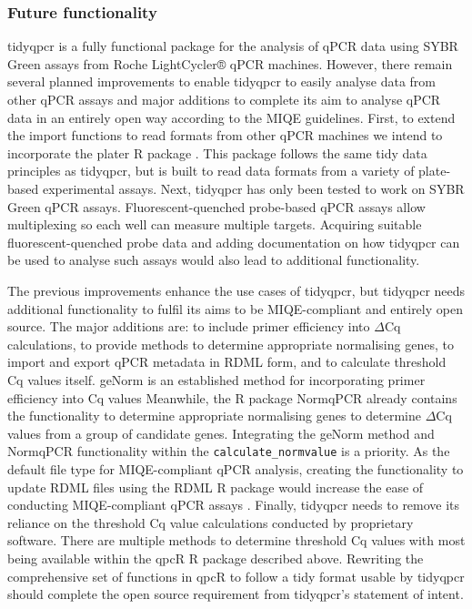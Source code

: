 \documentclass[../main.tex]{subfiles}
\begin{document}
\subsubsection{Future functionality}

tidyqpcr is a fully functional package for the analysis of qPCR data using SYBR Green assays from Roche LightCycler® qPCR machines. 
However, there remain several planned improvements to enable tidyqpcr to easily analyse data from other qPCR assays and major additions to complete its aim to analyse qPCR data in an entirely open way according to the MIQE guidelines.
First, to extend the import functions to read formats from other qPCR machines we intend to incorporate the plater R package \parencite{Hughes2016}.
This package follows the same tidy data principles as tidyqpcr, but is built to read data formats from a variety of plate-based experimental assays.
Next, tidyqpcr has only been tested to work on SYBR Green qPCR assays.
Fluorescent-quenched probe-based qPCR assays allow multiplexing so each well can measure multiple targets. 
Acquiring suitable fluorescent-quenched probe data and adding documentation on how tidyqpcr can be used to analyse such assays would also lead to additional functionality. 

The previous improvements enhance the use cases of tidyqpcr, but tidyqpcr needs additional functionality to fulfil its aims to be MIQE-compliant and entirely open source.
The major additions are: to include primer efficiency into $\Delta$Cq calculations, to provide methods to determine appropriate normalising genes, to import and export qPCR metadata in RDML form, and to calculate threshold Cq values itself. 
geNorm is an established method for incorporating primer efficiency into Cq values 
Meanwhile, the R package NormqPCR already contains the functionality to determine appropriate normalising genes to determine $\Delta$Cq values from a group of candidate genes. 
Integrating the geNorm method and NormqPCR functionality within the \lstinline{calculate_normvalue} is a priority.
As the default file type for MIQE-compliant qPCR analysis, creating the functionality to update RDML files using the RDML R package would increase the ease of conducting MIQE-compliant qPCR assays \parencite{Roediger2017}.
Finally, tidyqpcr needs to remove its reliance on the threshold Cq value calculations conducted by proprietary software. 
There are multiple methods to determine threshold Cq values with most being available within the qpcR R package described above.
Rewriting the comprehensive set of functions in qpcR to follow a tidy format usable by tidyqpcr should complete the open source requirement from tidyqpcr's statement of intent. 
\end{document}
